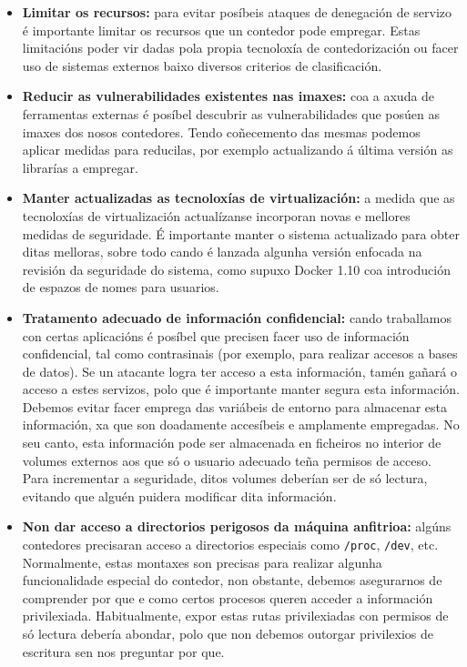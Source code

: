 \begin{itemize}
    \item \textbf{Limitar os recursos:} para evitar posíbeis ataques de denegación de servizo é importante limitar os recursos que un contedor pode empregar. Estas limitacións poder vir dadas pola propia tecnoloxía de contedorización ou facer uso de sistemas externos baixo diversos criterios de clasificación.
    
    \item \textbf{Reducir as vulnerabilidades existentes nas imaxes:} coa a axuda de ferramentas externas é posíbel descubrir as vulnerabilidades que posúen as imaxes dos nosos contedores. Tendo coñecemento das mesmas podemos aplicar medidas para reducilas, por exemplo actualizando á última versión as librarías a empregar.
    
    \item \textbf{Manter actualizadas as tecnoloxías de virtualización:} a medida que as tecnoloxías de virtualización actualízanse incorporan novas e mellores medidas de seguridade. É importante manter o sistema actualizado para obter ditas melloras, sobre todo cando é lanzada algunha versión enfocada na revisión da seguridade do sistema, como supuxo Docker 1.10 coa introdución de espazos de nomes para usuarios.
    
    \item \textbf{Tratamento adecuado de información confidencial:} cando traballamos con certas aplicacións é posíbel que precisen facer uso de información confidencial, tal como contrasinais (por exemplo, para realizar accesos a bases de datos). Se un atacante logra ter acceso a esta información, tamén gañará o acceso a estes servizos, polo que é importante manter segura esta información. Debemos evitar facer emprega das variábeis de entorno para almacenar esta información, xa que son doadamente accesíbeis e amplamente empregadas. No seu canto, esta información pode ser almacenada en ficheiros no interior de volumes externos aos que só o usuario adecuado teña permisos de acceso. Para incrementar a seguridade, ditos volumes deberían ser de só lectura, evitando que alguén puidera modificar dita información.
    
    \item \textbf{Non dar acceso a directorios perigosos da máquina anfitrioa:} algúns contedores precisaran acceso a directorios especiais como {\tt /proc}, {\tt /dev}, etc. Normalmente, estas montaxes son precisas para realizar algunha funcionalidade especial do contedor, non obstante, debemos asegurarnos de comprender por que e como certos procesos queren acceder a información privilexiada. Habitualmente, expor estas rutas privilexiadas con permisos de só lectura debería abondar, polo que non debemos outorgar privilexios de escritura sen nos preguntar por que.
    

\end{itemize}
